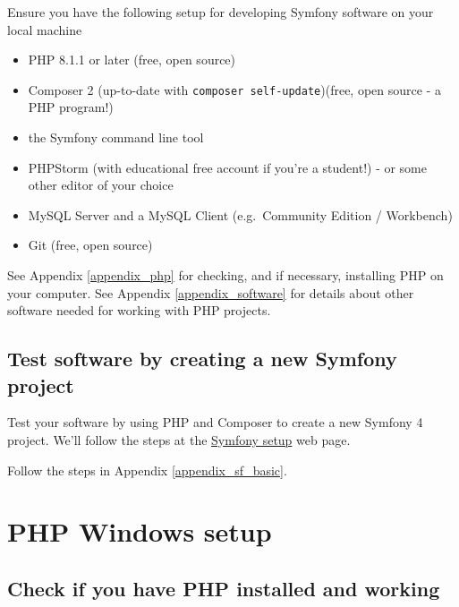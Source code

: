 \documentclass[a4paperpaper,openright]{book}
\providecommand{\tightlist}{%
  \setlength{\itemsep}{0pt}\setlength{\parskip}{0pt}}
\begin{document}
Ensure you have the following setup for developing Symfony software on
your local machine

\begin{itemize}
\tightlist
\item
  PHP 8.1.1 or later (free, open source)
\item
  Composer 2 (up-to-date with \texttt{composer\ self-update})(free, open
  source - a PHP program!)
\item
  the Symfony command line tool
\item
  PHPStorm (with educational free account if you're a student!) - or
  some other editor of your choice
\item
  MySQL Server and a MySQL Client (e.g.~Community Edition / Workbench)
\item
  Git (free, open source)
\end{itemize}

See Appendix \ref{appendix_php} for checking, and if necessary,
installing PHP on your computer. See Appendix \ref{appendix_software}
for details about other software needed for working with PHP projects.

\hypertarget{test-software-by-creating-a-new-symfony-project}{%
\section{Test software by creating a new Symfony
project}\label{test-software-by-creating-a-new-symfony-project}}

Test your software by using PHP and Composer to create a new Symfony 4
project. We'll follow the steps at the
\href{https://symfony.com/doc/current/setup.html}{Symfony setup} web
page.

Follow the steps in Appendix \ref{appendix_sf_basic}.

\hypertarget{php-windows-setup}{%
\chapter{\texorpdfstring{PHP Windows
setup\label{appendix_php}}{PHP Windows setup}}\label{php-windows-setup}}

\hypertarget{check-if-you-have-php-installed-and-working}{%
\section{Check if you have PHP installed and
working}\label{check-if-you-have-php-installed-and-working}}
\end{document}
